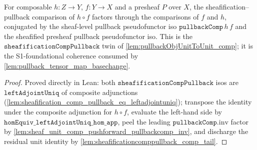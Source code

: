 \begin{lemma}\leanok
  \label{lem:sheafificationcomppullback_comp}
  For composable \(h : Z \to Y\), \(f : Y \to X\) and a presheaf \(P\) over \(X\), the
  sheafification--pullback comparison of \(h \circ f\) factors through the comparisons of
  \(f\) and \(h\), conjugated by the sheaf-level pullback pseudofunctor iso
  \(\mathtt{pullbackComp}\,h\,f\) and the sheafified presheaf pullback pseudofunctor iso.
  This is the \(\mathtt{sheafificationCompPullback}\) twin of \cref{lem:pullbackObjUnitToUnit_comp};
  it is the S1-foundational coherence consumed by \cref{lem:pullback_tensor_map_basechange}.
\end{lemma}
\begin{proof}
  \leanok
  Proved directly in Lean: both \(\mathtt{sheafificationCompPullback}\) isos are
  \(\mathtt{leftAdjointUniq}\) of composite adjunctions
  (\cref{lem:sheafification_comp_pullback_eq_leftadjointuniq}); transpose the identity under
  the composite adjunction for \(h \circ f\), evaluate the left-hand side by
  \(\mathtt{homEquiv\_leftAdjointUniq\_hom\_app}\), peel the leading
  \(\mathtt{pullbackComp}.\mathrm{inv}\) factor by
  \cref{lem:sheaf_unit_comp_pushforward_pullbackcomp_inv}, and discharge the residual unit
  identity by \cref{lem:sheafificationcomppullback_comp_tail}.
\end{proof}

